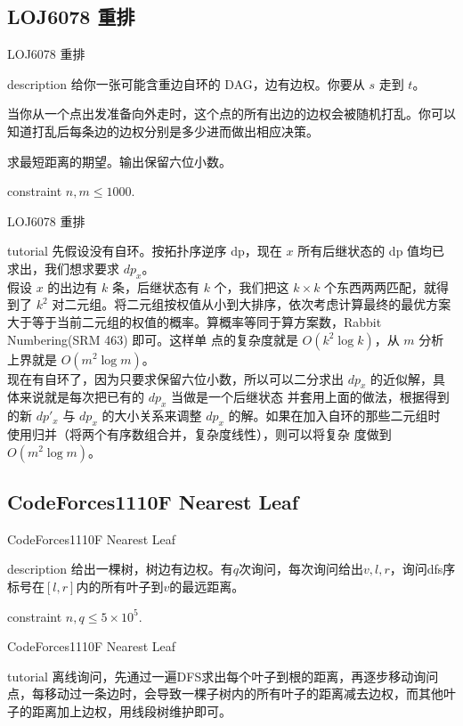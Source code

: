 \documentclass{beamer}
\begin{document}
\subsection{LOJ6078 重排}
\begin{frame}{LOJ6078 重排}
	\begin{block}{description}
		给你一张可能含重边自环的 DAG，边有边权。你要从 $s$ 走到 $t$。
		
		当你从一个点出发准备向外走时，这个点的所有出边的边权会被随机打乱。你可以知道打乱后每条边的边权分别是多少进而做出相应决策。
		
		求最短距离的期望。输出保留六位小数。
	\end{block}
	\begin{block}{constraint}
		$n, m \le 1000.$
	\end{block}
\end{frame}
\begin{frame}{LOJ6078 重排}
	\begin{block}{tutorial}
		先假设没有自环。按拓扑序逆序 dp，现在 $x$ 所有后继状态的 dp 值均已求出，我们想求要求 $dp_x$。\\
		
		假设 $x$ 的出边有 $k$ 条，后继状态有 $k$ 个，我们把这 $k \times k$ 个东西两两匹配，就得到了 $k^2$ 对二元组。将二元组按权值从小到大排序，依次考虑计算最终的最优方案大于等于当前二元组的权值的概率。算概率等同于算方案数，Rabbit Numbering(SRM 463) 即可。这样单
		点的复杂度就是 $O(k^2\log k)$，从 $m$ 分析上界就是 $O(m^2\log m)$。\\
		
		现在有自环了，因为只要求保留六位小数，所以可以二分求出 $dp_x$
		的近似解，具体来说就是每次把已有的 $dp_x$ 当做是一个后继状态
		并套用上面的做法，根据得到的新 $dp'_x$ 与 $dp_x$ 的大小关系来调整 $dp_x$ 的解。如果在加入自环的那些二元组时
		使用归并（将两个有序数组合并，复杂度线性），则可以将复杂
		度做到 $O(m^2\log m)$。
	\end{block}
\end{frame}


\subsection{CodeForces1110F Nearest Leaf}
\begin{frame}{CodeForces1110F Nearest Leaf}
	\begin{block}{description}
		给出一棵树，树边有边权。有$q$次询问，每次询问给出$v, l, r$，询问dfs序标号在$[l, r]$内的所有叶子到$v$的最远距离。
	\end{block}
	\begin{block}{constraint}
		$n, q \le 5 \times 10^5.$
	\end{block}
\end{frame}
\begin{frame}{CodeForces1110F Nearest Leaf}
	\begin{block}{tutorial}
		离线询问，先通过一遍DFS求出每个叶子到根的距离，再逐步移动询问点，每移动过一条边时，会导致一棵子树内的所有叶子的距离减去边权，而其他叶子的距离加上边权，用线段树维护即可。
	\end{block}
\end{frame}
\end{document}
